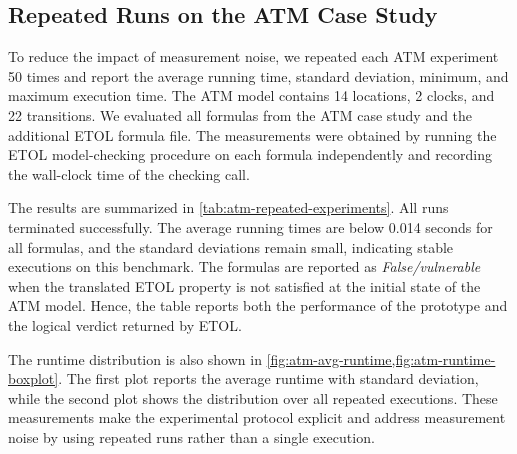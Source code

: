 
\subsection{Repeated Runs on the ATM Case Study}
\label{subsec:atm-repeated-runs}

To reduce the impact of measurement noise, we repeated each ATM experiment 50 times and report the average running time, standard deviation, minimum, and maximum execution time. The ATM model contains 14 locations, 2 clocks, and 22 transitions. We evaluated all formulas from the ATM case study and the additional ETOL formula file. The measurements were obtained by running the ETOL model-checking procedure on each formula independently and recording the wall-clock time of the checking call.

The results are summarized in \cref{tab:atm-repeated-experiments}. All runs terminated successfully. The average running times are below 0.014 seconds for all formulas, and the standard deviations remain small, indicating stable executions on this benchmark. The formulas are reported as \emph{False/vulnerable} when the translated ETOL property is not satisfied at the initial state of the ATM model. Hence, the table reports both the performance of the prototype and the logical verdict returned by ETOL.

The runtime distribution is also shown in \cref{fig:atm-avg-runtime,fig:atm-runtime-boxplot}. The first plot reports the average runtime with standard deviation, while the second plot shows the distribution over all repeated executions. These measurements make the experimental protocol explicit and address measurement noise by using repeated runs rather than a single execution.
